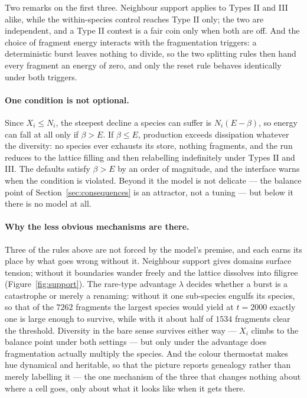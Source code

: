 \documentclass[11pt,a4paper]{article}
\begin{document}
\noindent
Two remarks on the first three. Neighbour support applies to Types II and III alike, while
the within-species control reaches Type II only; the two are independent, and a Type II
contest is a fair coin only when both are off. And the choice of fragment energy interacts
with the fragmentation triggers: a deterministic burst leaves nothing to divide, so the two
splitting rules then hand every fragment an energy of zero, and only the reset rule behaves
identically under both triggers.

\paragraph{One condition is not optional.} Since $X_i \le N_i$, the steepest decline a
species can suffer is $N_i(E - \beta)$, so energy can fall at all only if $\beta > E$. If
$\beta \le E$, production exceeds dissipation whatever the diversity: no species ever
exhausts its store, nothing fragments, and the run reduces to the lattice filling and then
relabelling indefinitely under Types II and III. The defaults satisfy $\beta > E$ by an
order of magnitude, and the interface warns when the condition is violated. Beyond it the
model is not delicate --- the balance point of Section~\ref{sec:consequences} is an
attractor, not a tuning --- but below it there is no model at all.

\paragraph{Why the less obvious mechanisms are there.} Three of the rules above are not
forced by the model's premise, and each earns its place by what goes wrong without it. Neighbour
support gives domains surface tension; without it boundaries wander freely and the lattice
dissolves into filigree (Figure~\ref{fig:support}). The rare-type advantage $\lambda$ decides
whether a burst is a catastrophe or merely a renaming: without it one sub-species engulfs
its species, so that of the $7262$ fragments the largest species would yield at $t = 2000$
exactly one is large enough to survive, while with it about half of $1534$ fragments clear
the threshold. Diversity in the bare sense survives either way --- $X_i$ climbs to the balance
point under both settings --- but only under the advantage does fragmentation actually
multiply the species. And the colour thermostat makes hue dynamical and
heritable, so that the picture reports genealogy rather than merely labelling it --- the one
mechanism of the three that changes nothing about where a cell goes, only about what it
looks like when it gets there.
\end{document}
